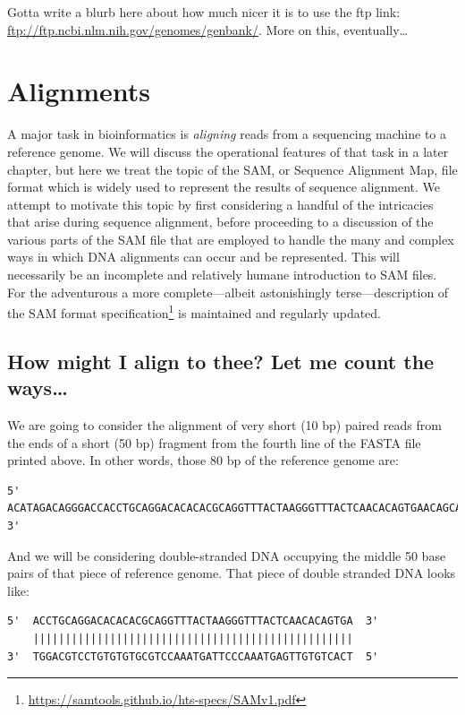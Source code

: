 \documentclass[]{krantz}
\renewcommand{\href}[2]{#2\footnote{\url{#1}}}
\begin{document}
Gotta write a blurb here about how much nicer it is to
use the ftp link: \url{ftp://ftp.ncbi.nlm.nih.gov/genomes/genbank/}. More on this, eventually\ldots{}

\hypertarget{alignments}{%
\section{Alignments}\label{alignments}}

A major task in bioinformatics is \emph{aligning} reads from a sequencing machine
to a reference genome. We will discuss the operational features of that task
in a later chapter, but here we treat the topic of the SAM, or
Sequence Alignment Map, file format which is widely used to represent the results of
sequence alignment. We attempt to motivate this topic by first considering a handful
of the intricacies that arise during sequence alignment, before proceeding
to a discussion of the various parts of the SAM file that are employed to handle
the many and complex ways in which DNA alignments can occur and be represented.
This will necessarily be an incomplete and relatively humane introduction to SAM files.
For the adventurous a more complete---albeit astonishingly terse---description of the
\href{https://samtools.github.io/hts-specs/SAMv1.pdf}{SAM format specification}
is maintained and regularly updated.

\hypertarget{how-might-i-align-to-thee-let-me-count-the-ways}{%
\subsection{How might I align to thee? Let me count the ways\ldots{}}\label{how-might-i-align-to-thee-let-me-count-the-ways}}

We are going to consider the alignment of very short (10 bp)
paired reads from the ends of a short (50 bp) fragment from
the fourth line of the FASTA file printed above. In other words,
those 80 bp of the reference genome are:

\begin{verbatim}
5'  ACATAGACAGGGACCACCTGCAGGACACACACGCAGGTTTACTAAGGGTTTACTCAACACAGTGAACAGCATATACCAGA  3'
\end{verbatim}

And we will be considering double-stranded DNA occupying the middle 50 base
pairs of that piece of reference genome. That piece of double stranded
DNA looks like:

\begin{verbatim}
5'  ACCTGCAGGACACACACGCAGGTTTACTAAGGGTTTACTCAACACAGTGA  3'
    ||||||||||||||||||||||||||||||||||||||||||||||||||
3'  TGGACGTCCTGTGTGTGCGTCCAAATGATTCCCAAATGAGTTGTGTCACT  5'
\end{verbatim}
\end{document}
